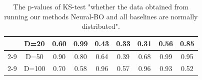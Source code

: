 \begin{table}[ht]
{\begin{tabular}{|cc|c|c|c|c|c|c|c|}
\multicolumn{1}{|c|}{}                                                                                  & D=20  & 0.60                                                         & 0.99                                                             & 0.43                                                      & 0.33                                                     & 0.31                                                     & 0.56          & 0.85        \\ \cline{2-9} 
\multicolumn{1}{|c|}{}                                                                                  & D=50  & 0.90                                                         & 0.80                                                             & 0.64                                                      & 0.39                                                     & 0.68                                                     & 0.99          & 0.95        \\ \cline{2-9} 
\multicolumn{1}{|c|}{}                                                                                  & D=100 & 0.70                                                         & 0.58                                                             & 0.96                                                      & 0.57                                                     & 0.96                                                     & 0.93          & 0.52        \\ \hline
\end{tabular}
}
\caption{The p-values of KS-test "whether the data obtained from running our methods Neural-BO and all baselines are normally distributed".}
\label{tab:neural-bo_ks_test}
\end{table}



